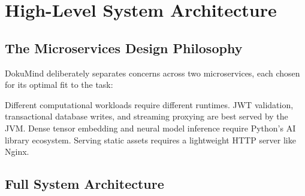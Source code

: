 \documentclass[12pt,a4paper]{report}
\begin{document}
\chapter{High-Level System Architecture}

\section{The Microservices Design Philosophy}

DokuMind deliberately separates concerns across two microservices, each chosen for its optimal fit to the task:

\begin{infobox}
Different computational workloads require different runtimes. JWT validation, transactional database writes, and streaming proxying are best served by the JVM. Dense tensor embedding and neural model inference require Python's AI library ecosystem. Serving static assets requires a lightweight HTTP server like Nginx.
\end{infobox}

\section{Full System Architecture}
\end{document}
